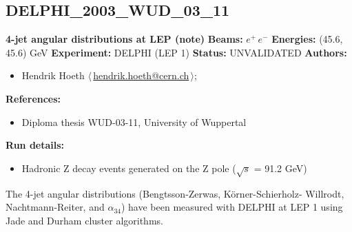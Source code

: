 \subsection{DELPHI\_2003\_WUD\_03\_11}
\textbf{4-jet angular distributions at LEP (note)}\newline
\textbf{Beams:} $e^+$\,$e^-$ \newline
\textbf{Energies:} (45.6, 45.6) GeV \newline
\textbf{Experiment:} DELPHI (LEP 1) \newline
\textbf{Status:} UNVALIDATED\newline
\textbf{Authors:}
\begin{itemize}
  \item Hendrik Hoeth $\langle\,$\href{mailto:hendrik.hoeth@cern.ch}{hendrik.hoeth@cern.ch}$\,\rangle$;
\end{itemize}
\textbf{References:}
\begin{itemize}
  \item Diploma thesis WUD-03-11, University of Wuppertal
\end{itemize}
\textbf{Run details:}
\begin{itemize}

  \item Hadronic Z decay events generated on the Z pole (\ensuremath{\sqrt{s}} = 91.2 GeV)\end{itemize}

\noindent The 4-jet angular distributions (Bengtsson-Zerwas, K\"orner-Schierholz- Willrodt, Nachtmann-Reiter, and $\alpha_{34}$) have been measured with DELPHI at LEP 1 using Jade and Durham cluster algorithms.

\clearpage


\clearpage


